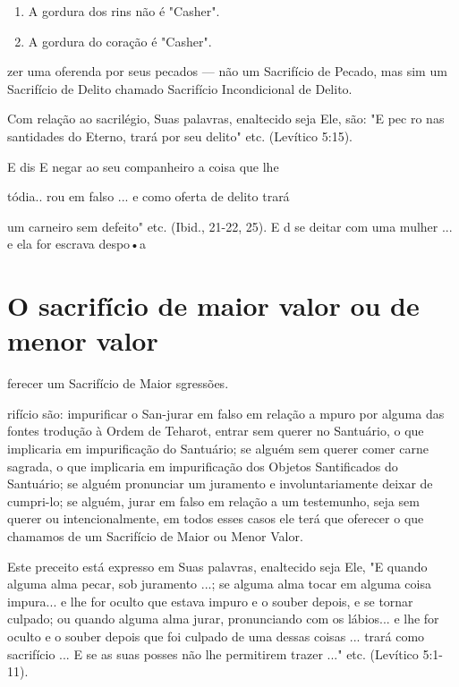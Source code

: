 \begin{itemize}
\begin{enumrate}
\begin{itemize}
\begin{itemize}
\begin{enumerate}
\def\labelenumi{\arabic{enumi}.}
\setcounter{enumi}{87}
\item
 
 A gordura dos rins não é "Casher".
 
\item
 
 A gordura do coração é "Casher".
 
\end{enumerate}

zer uma oferenda por seus pecados --- não um Sacrifício de Pecado, mas
sim um Sacrifício de Delito chamado Sacrifício Incondicional de Delito.

Com relação ao sacrilégio, Suas palavras, enaltecido seja Ele, são: "E
pec ro nas santidades do Eterno, trará por seu delito" etc. (Levítico
5:15).

E dis E negar ao seu companheiro a coisa que lhe

tódia.. rou em falso ... e como oferta de delito trará

um carneiro sem defeito" etc. (Ibid., 21-22, 25). E d se deitar com uma
mulher ... e ela for escrava despo•a

\section{O sacrifício de maior valor ou de menor valor}


ferecer um Sacrifício de Maior sgressões.


rifício são: impurificar o San-jurar em falso em relação a mpuro por
alguma das fontes trodução à Ordem de Teharot, entrar sem querer no
Santuário, o que implicaria em impurificação do Santuá­rio; se alguém
sem querer comer carne sagrada, o que implicaria em impurifi­cação dos
Objetos Santificados do Santuário; se alguém pronunciar um jura­mento e
involuntariamente deixar de cumpri-lo; se alguém, jurar em falso em
relação a um testemunho, seja sem querer ou intencionalmente, em todos
es­ses casos ele terá que oferecer o que chamamos de um Sacrifício de
Maior ou Menor Valor.

Este preceito está expresso em Suas palavras, enaltecido seja Ele, "E
quando alguma alma pecar, sob juramento ...; se alguma alma tocar em
alguma coisa impura... e lhe for oculto que estava impuro e o souber
depois, e se tor­nar culpado; ou quando alguma alma jurar, pronunciando
com os lábios... e lhe for oculto e o souber depois que foi culpado de
uma dessas coisas ... trará como sacrifício ... E se as suas posses não
lhe permitirem trazer ..." etc. (Levíti­co 5:1-11).


\end{itemize}
\end{itemize}
\end{enumrate}
\end{itemize}

